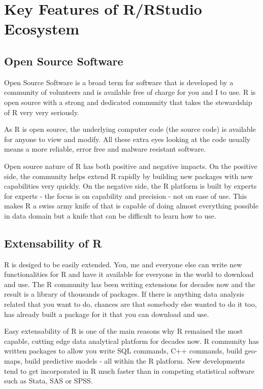 \documentclass[]{krantz}
\theoremstyle{definition}
\theoremstyle{definition}
\theoremstyle{definition}
\theoremstyle{remark}
\begin{document}
\section{Key Features of R/RStudio
Ecosystem}\label{key-features-of-rrstudio-ecosystem}

\subsection{Open Source Software}\label{open-source-software}

Open Source Software is a broad term for software that is developed by a
community of volunteers and is available free of charge for you and I to
use. R is open source with a strong and dedicated community that takes
the stewardship of R very very seriously.

As R is open source, the underlying computer code (the source code) is
available for anyone to view and modify. All these extra eyes looking at
the code usually means a more reliable, error free and malware resistant
software.

Open source nature of R has both positive and negative impacts. On the
positive side, the community helps extend R rapidly by building new
packages with new capabilities very quickly. On the negative side, the R
platform is built by experts for experts - the focus is on capability
and precision - not on ease of use. This makes R a swiss army knife of
that is capable of doing almost everything possible in data domain but a
knife that can be difficult to learn how to use.

\subsection{Extensability of R}\label{extensability-of-r}

R is desiged to be easily extended. You, me and everyone else can write
new functionalities for R and have it available for everyone in the
world to download and use. The R community has been writing extensions
for decades now and the result is a library of thousands of packages. If
there is anything data analysis related that you want to do, chances are
that somebody else wanted to do it too, has already built a package for
it that you can download and use.

Easy extensability of R is one of the main reasons why R remained the
most capable, cutting edge data analytical platform for decades now. R
community has written packages to allow you write SQL commands, C++
commands, build geo-maps, build predictive models - all within the R
platform. New developments tend to get incorporated in R much faster
than in competing statistical software such as Stata, SAS or SPSS.
\end{document}
